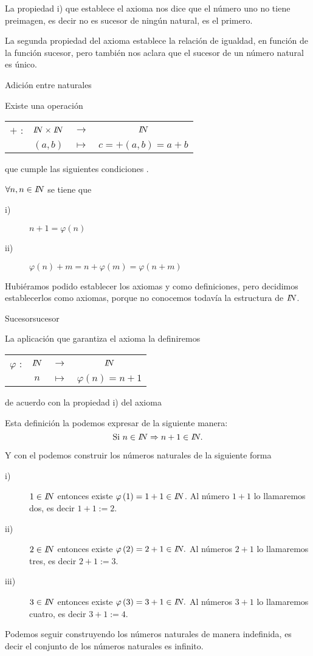 La propiedad i) que establece el axioma  nos dice que
el número uno no tiene preimagen, es decir no es sucesor de ningún
natural, es el primero.

La segunda propiedad del axioma  establece la relación
de igualdad, en función de la función sucesor, pero también nos aclara
que el sucesor de un número natural es único. \medskip{}
\medskip{}

\begin{axioma}{Adición entre naturales\label{ap5}}

Existe una operación %
\begin{tabular}{cccc}
$+$ : &
$\na\times\na$ &
$\rightarrow$ &
$\na$\tabularnewline
 &
$\left(a,b\right)$ &
$\mapsto$ &
$c=+\left(a,b\right)=a+b$\tabularnewline
\end{tabular} que cumple las siguientes condiciones .

$\forall n,n\in\na$ se tiene que 
\begin{description}
\item [{i)}] $n+1=\varphi\left(n\right)$
\item [{ii)}] $\varphi\left(n\right)+m=n+\varphi\left(m\right)=\varphi\left(n+m\right)$
\end{description}
\end{axioma}

Hubiéramos podido establecer los axiomas  y 
como definiciones, pero decidimos establecerlos como axiomas, porque
no conocemos todavía la estructura de $\na$.

\begin{defi}{Sucesor}{sucesor}

La aplicación que garantiza el axioma  la definiremos
\begin{tabular}{cccc}
$\varphi$ : &
$\na$ &
$\rightarrow$ &
$\na$\tabularnewline
 &
$n$ &
$\mapsto$ &
$\varphi\left(n\right)=n+1$\tabularnewline
\end{tabular} de acuerdo con la propiedad i) del axioma 

\end{defi}

Esta definición la podemos expresar de la siguiente manera:
\[
\mbox{Si \ensuremath{n\in\na\Rightarrow n+1\in\na.}}
\]

Y con el podemos construir los números naturales de la siguiente forma
\begin{description}
\item [{i)}] $1\in\na$ entonces existe $\varphi\left(1\right)=1+1\in\na$.
Al número $1+1$ lo llamaremos dos, es decir $1+1:=2.$
\item [{ii)}] $2\in\na$ entonces existe $\varphi\left(2\right)=2+1\in\na.$
Al números $2+1$ lo llamaremos tres, es decir $2+1:=3.$
\item [{iii)}] $3\in\na$ entonces existe $\varphi\left(3\right)=3+1\in\na.$
Al números $3+1$ lo llamaremos cuatro, es decir $3+1:=4.$
\end{description}
Podemos seguir construyendo los números naturales de manera indefinida,
es decir el conjunto de los números naturales es infinito. 

